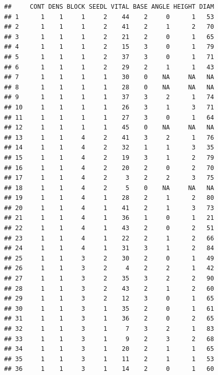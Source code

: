 \documentclass[krantz2]{krantz}\usepackage{knitr}%
\begin{document}
\begin{knitrout}\footnotesize
{}\color{fgcolor}\begin{kframe}
\begin{alltt}
 \hlkwb{<-} \hlstd{(} \hlstd{=} \hlstd{)}
\end{alltt}
\begin{verbatim}
##     CONT DENS BLOCK SEEDL VITAL BASE ANGLE HEIGHT DIAM
## 1      1    1     1     2    44    2     0      1   53
## 2      1    1     1     2    41    2     1      2   70
## 3      1    1     1     2    21    2     0      1   65
## 4      1    1     1     2    15    3     0      1   79
## 5      1    1     1     2    37    3     0      1   71
## 6      1    1     1     2    29    2     1      1   43
## 7      1    1     1     1    30    0    NA     NA   NA
## 8      1    1     1     1    28    0    NA     NA   NA
## 9      1    1     1     1    37    3     2      1   74
## 10     1    1     1     1    26    3     1      3   71
## 11     1    1     1     1    27    3     0      1   64
## 12     1    1     1     1    45    0    NA     NA   NA
## 13     1    1     4     2    41    3     2      1   76
## 14     1    1     4     2    32    1     1      3   35
## 15     1    1     4     2    19    3     1      2   79
## 16     1    1     4     2    20    2     0      2   70
## 17     1    1     4     2     3    2     2      3   75
## 18     1    1     4     2     5    0    NA     NA   NA
## 19     1    1     4     1    28    2     1      2   80
## 20     1    1     4     1    41    2     1      3   73
## 21     1    1     4     1    36    1     0      1   21
## 22     1    1     4     1    43    2     0      2   51
## 23     1    1     4     1    22    2     1      2   66
## 24     1    1     4     1    31    3     1      2   84
## 25     1    1     3     2    30    2     0      1   49
## 26     1    1     3     2     4    2     2      1   42
## 27     1    1     3     2    35    3     2      2   90
## 28     1    1     3     2    43    2     1      2   60
## 29     1    1     3     2    12    3     0      1   65
## 30     1    1     3     1    35    2     0      1   61
## 31     1    1     3     1    36    2     0      2   65
## 32     1    1     3     1     7    3     2      1   83
## 33     1    1     3     1     9    2     3      2   68
## 34     1    1     3     1    20    2     1      1   65
## 35     1    1     3     1    11    2     1      1   53
## 36     1    1     3     1    14    2     0      1   60

\end{verbatim}
\end{kframe}
\end{knitrout}
\end{document}
